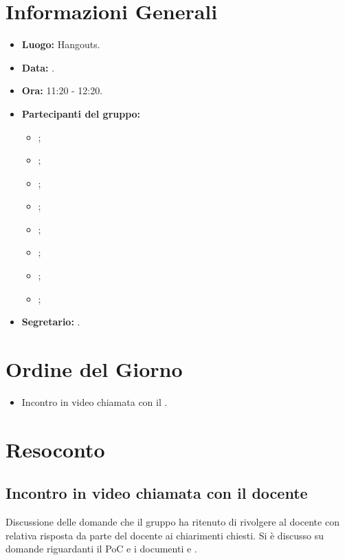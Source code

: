 \section{Informazioni Generali}
\begin{itemize}
	\item \textbf{Luogo:} Hangouts.
	\item \textbf{Data:} \Data.
	\item \textbf{Ora:} 11:20 - 12:20.
	\item \textbf{Partecipanti del gruppo:}
	\begin{itemize}
		\item \AT{};
		\item \BR{};  
		\item \CE{}; 
		\item \DF{};
		\item \LD{};
		\item \MC{};
		\item \PF{};
		\item \SE{};
	\end{itemize} 
	\item \textbf{Segretario:} \PF{}.
\end{itemize}

\section{Ordine del Giorno}
\begin{itemize}
	\item Incontro in video chiamata con il \VT{}.
\end{itemize}

\section{Resoconto}

\subsection{Incontro in video chiamata con il docente}
Discussione delle domande che il gruppo ha ritenuto di rivolgere al docente con relativa risposta da parte del docente ai chiarimenti chiesti. Si è discusso su domande riguardanti il PoC e i documenti \NdP e \PdP.

\clearpage